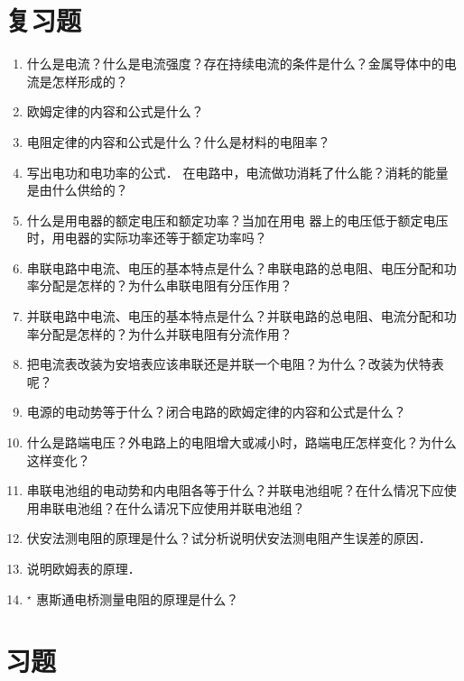 \section*{复习题}
\begin{enumerate}
    \item 什么是电流？什么是电流强度？存在持续电流的条件是什么？金属导体中的电流是怎样形成的？
    \item 欧姆定律的内容和公式是什么？
    \item 电阻定律的内容和公式是什么？什么是材料的电阻率？
    \item 写出电功和电功率的公式．
    在电路中，电流做功消耗了什么能？消耗的能量是由什么供给的？
    \item 什么是用电器的额定电压和额定功率？当加在用电
    器上的电压低于额定电压时，用电器的实际功率还等于额定功率吗？
    \item 串联电路中电流、电压的基本特点是什么？串联电路的总电阻、电压分配和功率分配是怎样的？为什么串联电阻有分压作用？
    \item 并联电路中电流、电压的基本特点是什么？并联电路的总电阻、电流分配和功率分配是怎样的？为什么并联电阻有分流作用？
    \item 把电流表改装为安培表应该串联还是并联一个电阻？为什么？改装为伏特表呢？
    \item 电源的电动势等于什么？闭合电路的欧姆定律的内容和公式是什么？
\item 什么是路端电压？外电路上的电阻增大或减小时，路端电圧怎样变化？为什么这样变化？
\item 串联电池组的电动势和内电阻各等于什么？并联电池组呢？在什么情况下应使用串联电池组？在什么请况下应使用并联电池组？
\item 伏安法测电阻的原理是什么？试分析说明伏安法测电阻产生误差的原因．
\item 说明欧姆表的原理．
\item$^\star$ 惠斯通电桥测量电阻的原理是什么？
\end{enumerate}


\section*{习题}



